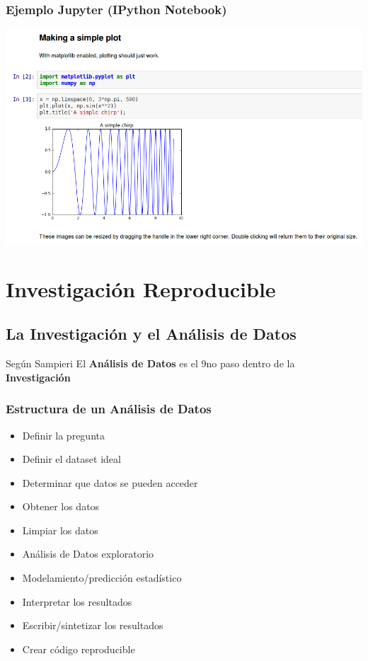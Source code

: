 \documentclass[sans serif,9pt,xcolor=dvipsnames]{beamer}%
\begin{document}
\begin{frame}
\frametitle{Ejemplo Jupyter (IPython Notebook)}
\includegraphics[scale=0.3]{imagenes/pynb.png} 
\end{frame}


\section{Investigación Reproducible}
\subsection{La Investigación y el Análisis de Datos}
\begin{frame}
\begin{block}{Según Sampieri}
\Large El \textbf{Análisis de Datos} es el 9no paso dentro de la \textbf{Investigación}
\end{block}
\end{frame}


\begin{frame}
\frametitle{Estructura de un Análisis de Datos}
\justifying
\begin{block}{}
\begin{itemize}
\item Definir la pregunta
\item Definir el dataset ideal
\item Determinar que datos se pueden acceder
\item Obtener los datos
\item Limpiar los datos
\item Análisis de Datos exploratorio
\item Modelamiento/predicción estadístico
\item Interpretar los resultados
\item Escribir/sintetizar los resultados
\item Crear código reproducible
\end{itemize}
\end{block}
\end{frame}
\end{document}
